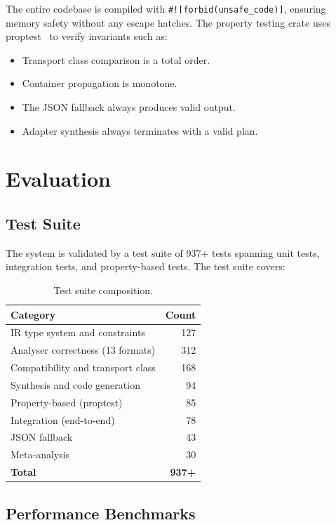 \documentclass[11pt,a4paper]{article}
\theoremstyle{definition}
\theoremstyle{remark}
\begin{document}
The entire codebase is compiled with \texttt{\#![forbid(unsafe\_code)]},
ensuring memory safety without any escape hatches. The property
testing crate uses proptest~\cite{proptest} to verify invariants
such as:
\begin{itemize}
  \item Transport class comparison is a total order.
  \item Container propagation is monotone.
  \item The JSON fallback always produces valid output.
  \item Adapter synthesis always terminates with a valid plan.
\end{itemize}

\section{Evaluation}\label{sec:evaluation}

\subsection{Test Suite}

The system is validated by a test suite of 937+ tests spanning unit
tests, integration tests, and property-based tests. The test suite
covers:

\begin{table}[ht]
\centering
\caption{Test suite composition.}
\label{tab:tests}
\begin{tabular}{@{}lr@{}}
\toprule
\textbf{Category} & \textbf{Count} \\
\midrule
IR type system and constraints & 127 \\
Analyser correctness (13 formats) & 312 \\
Compatibility and transport class & 168 \\
Synthesis and code generation & 94 \\
Property-based (proptest) & 85 \\
Integration (end-to-end) & 78 \\
JSON fallback & 43 \\
Meta-analysis & 30 \\
\midrule
\textbf{Total} & \textbf{937+} \\
\bottomrule
\end{tabular}
\end{table}

\subsection{Performance Benchmarks}
\end{document}
